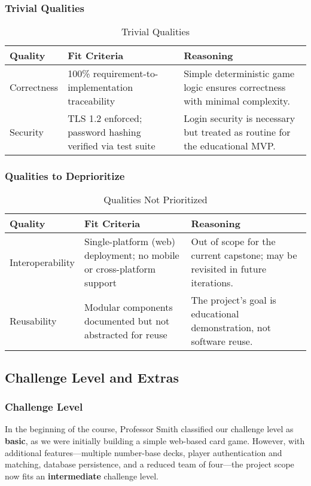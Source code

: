 \documentclass[12pt, titlepage]{article}
\begin{document}
\subsubsection{Trivial Qualities}
\begin{table}[H]
\centering
\caption{Trivial Qualities}
\begin{tabularx}{\textwidth}{p{3cm}p{4.5cm}X}
\toprule
\textbf{Quality} & \textbf{Fit Criteria} & \textbf{Reasoning} \\
\midrule
Correctness & 100\% requirement-to-implementation traceability & Simple deterministic game logic ensures correctness with minimal complexity. \\
Security & TLS 1.2 enforced; password hashing verified via test suite & Login security is necessary but treated as routine for the educational MVP. \\
\bottomrule
\end{tabularx}
\end{table}

\subsubsection{Qualities to Deprioritize}
\begin{table}[H]
\centering
\caption{Qualities Not Prioritized}
\begin{tabularx}{\textwidth}{p{3cm}p{4.5cm}X}
\toprule
\textbf{Quality} & \textbf{Fit Criteria} & \textbf{Reasoning} \\
\midrule
Interoperability & Single-platform (web) deployment; no mobile or cross-platform support & Out of scope for the current capstone; may be revisited in future iterations. \\
Reusability & Modular components documented but not abstracted for reuse & The project’s goal is educational demonstration, not software reuse. \\
\bottomrule
\end{tabularx}
\end{table}

\subsection{Challenge Level and Extras}

\subsubsection{Challenge Level}
In the beginning of the course, Professor Smith classified our challenge level as \textbf{basic}, as we were initially building a simple web-based card game. However, with additional features—multiple number-base decks, player authentication and matching, database persistence, and a reduced team of four—the project scope now fits an \textbf{intermediate} challenge level.
\end{document}
